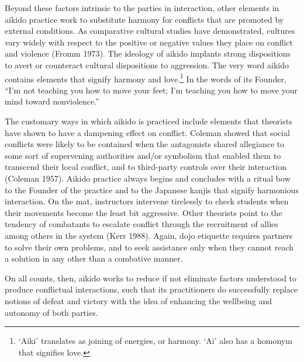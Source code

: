 Beyond these factors intrinsic to the parties in interaction, other elements in aikido practice work to substitute harmony for conflicts that are promoted by external conditions. As comparative cultural studies have demonstrated, cultures vary widely with respect to the positive or negative values they place on conflict and violence (Fromm 1973). The ideology of aikido implants strong dispositions to avert or counteract cultural dispositions to aggression. The very word aikido contains elements that signify harmony and love.\footnote{`Aiki' translates as joining of energies, or harmony. `Ai' also has a homonym that signifies love.} In the words of its Founder, ``I'm not teaching you how to move your feet; I'm teaching you how to move your mind toward nonviolence.'' 

The customary ways in which aikido is practiced include elements that theorists have shown to have a dampening effect on conflict. Coleman showed that social conflicts were likely to be contained when the antagonists shared allegiance to some sort of supervening authorities and/or symbolism that enabled them to transcend their local conflict, and to third-party controls over their interaction (Coleman 1957). Aikido practice always begins and concludes with a ritual bow to the Founder of the practice and to the Japanese kanjis that signify harmonious interaction. On the mat, instructors intervene tirelessly to check students when their movements become the least bit aggressive. Other theorists point to the tendency of combatants to escalate conflict through the recruitment of allies among others in the system (Kerr 1988). Again, dojo etiquette requires partners to solve their own problems, and to seek assistance only when they cannot reach a solution in any other than a combative manner.

On all counts, then, aikido works to reduce if not eliminate factors understood to produce conflictual interactions, such that its practitioners do successfully replace notions of defeat and victory with the idea of enhancing the wellbeing and autonomy of both parties.


